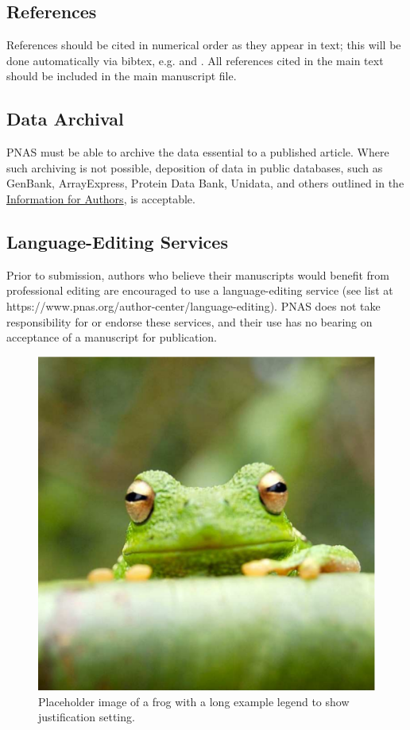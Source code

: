 \documentclass[9pt,twocolumn,twoside]{pnas-new}
\begin{document}
\subsection*{References}

References should be cited in numerical order as they appear in text; this will be done automatically via bibtex, e.g. \cite{belkin2002using} and \cite{berard1994embedding,coifman2005geometric,phdthesis,masterthesis}. All references cited in the main text should be included in the main manuscript file.

\subsection*{Data Archival}

PNAS must be able to archive the data essential to a published article. Where such archiving is not possible, deposition of data in public databases, such as GenBank, ArrayExpress, Protein Data Bank, Unidata, and others outlined in the \href{https://www.pnas.org/author-center/editorial-and-journal-policies#materials-and-data-availability}{Information for Authors}, is acceptable.

\subsection*{Language-Editing Services}
Prior to submission, authors who believe their manuscripts would benefit from professional editing are encouraged to use a language-editing service (see list at https://www.pnas.org/author-center/language-editing). PNAS does not take responsibility for or endorse these services, and their use has no bearing on acceptance of a manuscript for publication.

\begin{figure}%
\centering
\includegraphics[width=.8\linewidth]{frog.pdf}
\caption{Placeholder image of a frog with a long example legend to show justification setting.}
\label{fig:frog}
\end{figure}
\end{document}
